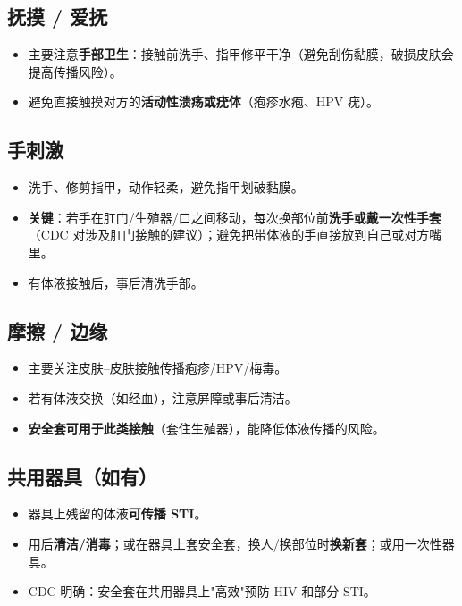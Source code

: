 \documentclass[12pt,UTF8,openany]{ctexbook}
\begin{document}
\subsection*{抚摸 / 爱抚}

\begin{itemize}[leftmargin=2em]
  \item 主要注意\textbf{手部卫生}：接触前洗手、指甲修平干净（避免刮伤黏膜，破损皮肤会提高传播风险）。
  \item 避免直接触摸对方的\textbf{活动性溃疡或疣体}（疱疹水疱、HPV 疣）。
\end{itemize}

\subsection*{手刺激}

\begin{itemize}[leftmargin=2em]
  \item 洗手、修剪指甲，动作轻柔，避免指甲划破黏膜。
  \item \textbf{关键}：若手在肛门/生殖器/口之间移动，每次换部位前\textbf{洗手或戴一次性手套}
        （CDC 对涉及肛门接触的建议）；避免把带体液的手直接放到自己或对方嘴里。
  \item 有体液接触后，事后清洗手部。
\end{itemize}

\subsection*{摩擦 / 边缘}

\begin{itemize}[leftmargin=2em]
  \item 主要关注皮肤--皮肤接触传播疱疹/HPV/梅毒。
  \item 若有体液交换（如经血），注意屏障或事后清洁。
  \item \textbf{安全套可用于此类接触}（套住生殖器），能降低体液传播的风险。
\end{itemize}

\subsection*{共用器具（如有）}

\begin{itemize}[leftmargin=2em]
  \item 器具上残留的体液\textbf{可传播 STI}。
  \item 用后\textbf{清洁/消毒}；或在器具上套安全套，换人/换部位时\textbf{换新套}；或用一次性器具。
  \item CDC 明确：安全套在共用器具上"高效"预防 HIV 和部分 STI。
\end{itemize}
\end{document}
